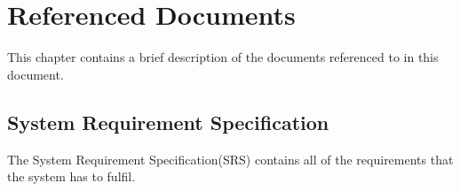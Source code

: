 \chapter{Referenced Documents}
This chapter contains a brief description of the documents referenced to in this document.


\section{System Requirement Specification}
The System Requirement Specification(SRS) contains all of the requirements that the system has to fulfil. 